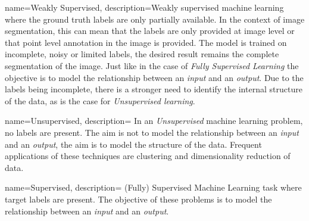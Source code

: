 
{
        name={Weakly Supervised},
        description={Weakly supervised machine learning where the ground truth labels are only partially available. 
        In the context of image segmentation, this can mean that the labels are only provided at image level or that point level annotation in the image is provided.
        The model is trained on incomplete, noisy or limited labels, the desired result remains the complete segmentation of the image.
        Just like in the case of \textit{Fully Supervised Learning} the objective is to model the relationship between an \textit{input} and an \textit{output}. 
        Due to the labels being incomplete, there is a stronger need to identify the internal structure of the data, as is the case for \textit{Unsupervised learning}.
        }
}




{
        name={Unsupervised},
        description={
                In an \textit{Unsupervised} machine learning problem, no labels are present. 
                The aim is not to model the relationship between an \textit{input} and an \textit{output}, the aim is to model the structure of the data.
                Frequent applications of these techniques are clustering and dimensionality reduction of data. 
                }
}

{
        name={Supervised},
        description={
                (Fully) Supervised Machine Learning task where target labels are present. 
                The objective of these problems is to model the relationship between an \textit{input} and an \textit{output}.
                }
}

